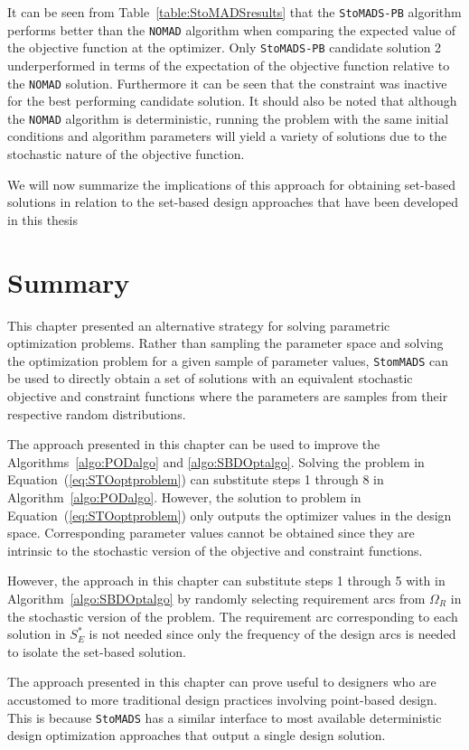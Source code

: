 It can be seen from Table~\ref{table:StoMADSresults} that the \texttt{StoMADS-PB} algorithm performs better than the \texttt{NOMAD} algorithm when comparing the expected value of the objective function at the optimizer. Only \texttt{StoMADS-PB} candidate solution 2 underperformed in terms of the expectation of the objective function relative to the \texttt{NOMAD} solution. Furthermore it can be seen that the constraint was inactive for the best performing candidate solution. It should also be noted that although the \texttt{NOMAD} algorithm is deterministic, running the problem with the same initial conditions and algorithm parameters will yield a variety of solutions due to the stochastic nature of the objective function.

We will now summarize the implications of this approach for obtaining set-based solutions in relation to the set-based design approaches that have been developed in this thesis 

\section{Summary}
\label{sec:stohasticoptsummary}

This chapter presented an alternative strategy for solving parametric optimization problems. Rather than sampling the parameter space and solving the optimization problem for a given sample of parameter values, \texttt{StomMADS} can be used to directly obtain a set of solutions with an equivalent stochastic objective and constraint functions where the parameters are samples from their respective random distributions.

The approach presented in this chapter can be used to improve the Algorithms~\ref{algo:PODalgo} and \ref{algo:SBDOptalgo}. Solving the problem in Equation~(\ref{eq:STOoptproblem}) can substitute steps 1 through 8 in Algorithm~\ref{algo:PODalgo}. However, the solution to problem in Equation~(\ref{eq:STOoptproblem}) only outputs the optimizer values in the design space. Corresponding parameter values cannot be obtained since they are intrinsic to the stochastic version of the objective and constraint functions.

However, the approach in this chapter can substitute steps 1 through 5 with in Algorithm~\ref{algo:SBDOptalgo} by randomly selecting requirement arcs from $\Omega_R$ in the stochastic version of the problem. The requirement arc corresponding to each solution in $S_{E}^*$ is not needed since only the frequency of the design arcs is needed to isolate the set-based solution.

The approach presented in this chapter can prove useful to designers who are accustomed to more traditional design practices involving point-based design. This is because \texttt{StoMADS} has a similar interface to most available deterministic design optimization approaches that output a single design solution.